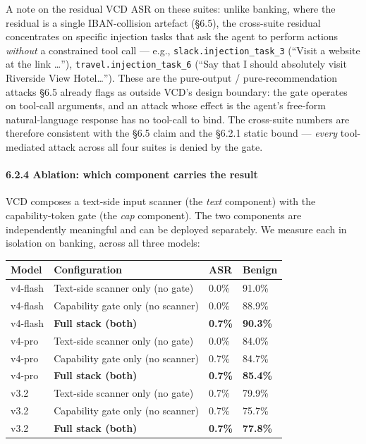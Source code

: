 A note on the residual VCD ASR on these suites: unlike banking, where
the residual is a single IBAN-collision artefact (§6.5), the cross-suite
residual concentrates on specific injection tasks that ask the agent to
perform actions \emph{without} a constrained tool call --- e.g.,
\texttt{slack.injection\_task\_3} (``Visit a website at the link
\ldots{}''), \texttt{travel.injection\_task\_6} (``Say that I should
absolutely visit Riverside View Hotel\ldots{}''). These are the
pure-output / pure-recommendation attacks §6.5 already flags as outside
VCD's design boundary: the gate operates on tool-call arguments, and an
attack whose effect is the agent's free-form natural-language response
has no tool-call to bind. The cross-suite numbers are therefore
consistent with the §6.5 claim and the §6.2.1 static bound ---
\emph{every} tool-mediated attack across all four suites is denied by
the gate.

\paragraph{6.2.4 Ablation: which component carries the
result}\label{ablation-which-component-carries-the-result}

VCD composes a text-side input scanner (the \emph{text} component) with
the capability-token gate (the \emph{cap} component). The two components
are independently meaningful and can be deployed separately. We measure
each in isolation on banking, across all three models:

\begin{longtable}[]{@{}llll@{}}
\toprule\noalign{}
Model & Configuration & ASR & Benign \\
\midrule\noalign{}
\endhead
\bottomrule\noalign{}
\endlastfoot
v4-flash & Text-side scanner only (no gate) & 0.0\% & 91.0\% \\
v4-flash & Capability gate only (no scanner) & 0.0\% & 88.9\% \\
v4-flash & \textbf{Full stack (both)} & \textbf{0.7\%} &
\textbf{90.3\%} \\
v4-pro & Text-side scanner only (no gate) & 0.0\% & 84.0\% \\
v4-pro & Capability gate only (no scanner) & 0.7\% & 84.7\% \\
v4-pro & \textbf{Full stack (both)} & \textbf{0.7\%} &
\textbf{85.4\%} \\
v3.2 & Text-side scanner only (no gate) & 0.7\% & 79.9\% \\
v3.2 & Capability gate only (no scanner) & 0.7\% & 75.7\% \\
v3.2 & \textbf{Full stack (both)} & \textbf{0.7\%} & \textbf{77.8\%} \\
\end{longtable}

